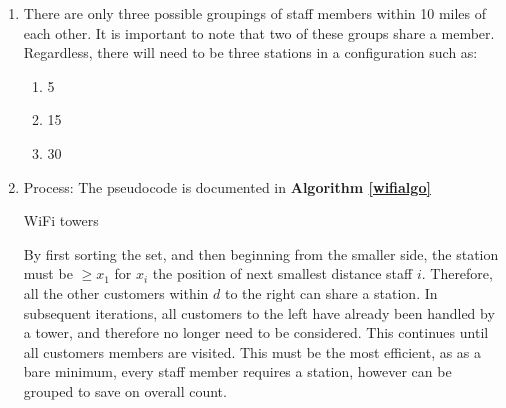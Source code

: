 \documentclass{article}
\begin{document}
\begin{enumerate}[label=\alph*)]
    \item There are only three possible groupings of staff members within 10 miles of each other.
        It is important to note that two of these groups share a member.
        Regardless, there will need to be three stations in a configuration such as:
        \begin{enumerate}[label={Station \arabic*:}, leftmargin=*]
            \item 5
            \item 15
            \item 30
        \end{enumerate}
    \item Process:
        The pseudocode is documented in \textbf{Algorithm \ref{wifialgo}}
        \begin{algorithm}
            \caption{WiFi towers}
            \label{wifialgo}
        \end{algorithm}
        
        By first sorting the set, and then beginning from the smaller side,
        the station must be $\geq x_1$ for $x_i$ the position of next smallest
        distance staff $i$.
        Therefore, all the other customers within $d$ to the right can share a station.
        In subsequent iterations, all customers to the left have already been
        handled by a tower, and therefore no longer need to be considered.
        This continues until all customers members are visited.
        This must be the most efficient, as as a bare minimum, every staff member
        requires a station, however can be grouped to save on overall count.


\end{enumerate}
\end{document}
